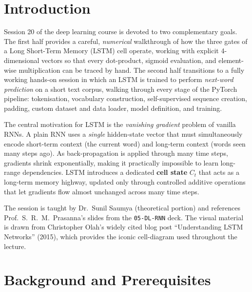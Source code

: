 \documentclass[12pt,a4paper]{article}
\begin{document}
\newpage

\section{Introduction}
\label{sec:intro}

Session 20 of the deep learning course is devoted to two complementary goals.
The first half provides a careful, \emph{numerical} walkthrough of how the three
gates of a Long Short-Term Memory (LSTM) cell operate, working with explicit
4-dimensional vectors so that every dot-product, sigmoid evaluation, and
element-wise multiplication can be traced by hand.
The second half transitions to a fully working hands-on session in which an
LSTM is trained to perform \emph{next-word prediction} on a short text corpus,
walking through every stage of the PyTorch pipeline: tokenisation, vocabulary
construction, self-supervised sequence creation, padding, custom dataset and
data loader, model definition, and training.

\begin{keyinsight}
  The central motivation for LSTM is the \emph{vanishing gradient} problem of
  vanilla RNNs.  A plain RNN uses a \emph{single} hidden-state vector that must
  simultaneously encode short-term context (the current word) and long-term
  context (words seen many steps ago).  As back-propagation is applied through
  many time steps, gradients shrink exponentially, making it practically
  impossible to learn long-range dependencies.
  LSTM introduces a dedicated \textbf{cell state} $C_t$ that acts as a
  long-term memory highway, updated only through controlled additive operations
  that let gradients flow almost unchanged across many time steps.
\end{keyinsight}

The session is taught by Dr.\ Sunil Saumya (theoretical portion) and references
Prof.\ S.\ R.\ M.\ Prasanna's slides from the \texttt{05-DL-RNN} deck.
The visual material is drawn from Christopher Olah's widely cited blog post
``Understanding LSTM Networks'' (2015), which provides the iconic cell-diagram
used throughout the lecture.

\section{Background and Prerequisites}
\label{sec:background}
\end{document}
